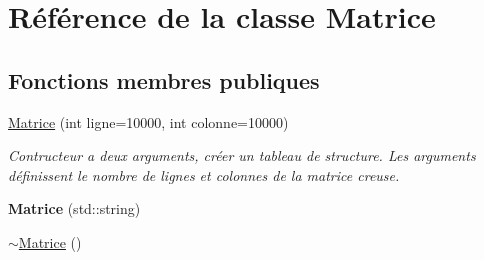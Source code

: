 \hypertarget{classMatrice}{\section{Référence de la classe Matrice}
\label{classMatrice}
}
\subsection*{Fonctions membres publiques}
\begin{DoxyCompactItemize}
\item 
\hyperlink{classMatrice_a381368ea1a5753a9864c31a1e1596a2e}{Matrice} (int ligne=10000, int colonne=10000)
\begin{DoxyCompactList}\small\item\em Contructeur a deux arguments, créer un tableau de structure. Les arguments définissent le nombre de lignes et colonnes de la matrice creuse. \end{DoxyCompactList}\item 
\hypertarget{classMatrice_a7a9d99db5f24a3b2c9b662d68b17e18c}{{\bfseries Matrice} (std\-::string)}\label{classMatrice_a7a9d99db5f24a3b2c9b662d68b17e18c}

\item 
\hypertarget{classMatrice_ae9076e71ad3223654b0d51225bc8b3c0}{\hyperlink{classMatrice_ae9076e71ad3223654b0d51225bc8b3c0}{$\sim$\-Matrice} ()}\label{classMatrice_ae9076e71ad3223654b0d51225bc8b3c0}


\end{DoxyCompactItemize}
